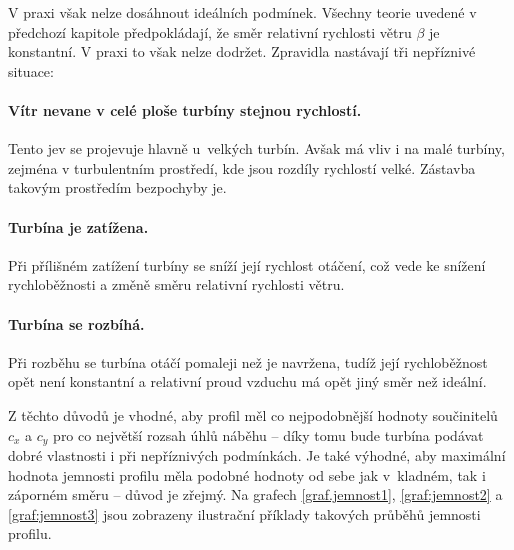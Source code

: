 V praxi však nelze dosáhnout ideálních podmínek. Všechny teorie uvedené v předchozí kapitole předpokládají, že směr relativní rychlosti větru $\beta$ je konstantní. V praxi to však nelze dodržet. Zpravidla nastávají tři nepříznivé situace:
\paragraph{Vítr nevane v celé ploše turbíny stejnou rychlostí.} Tento jev se projevuje hlavně u~velkých turbín. Avšak má vliv i na malé turbíny, zejména v turbulentním prostředí, kde jsou rozdíly rychlostí velké. Zástavba takovým prostředím bezpochyby je.
\paragraph{Turbína je zatížena.} Při přílišném zatížení turbíny se sníží její rychlost otáčení, což vede ke snížení rychloběžnosti a změně směru relativní rychlosti větru.
\paragraph{Turbína se rozbíhá.} Při rozběhu se turbína otáčí pomaleji než je navržena, tudíž její rychloběžnost opět není konstantní a relativní proud vzduchu má opět jiný směr než ideální.\vspace{0.5cm}

Z těchto důvodů je vhodné, aby profil měl co nejpodobnější hodnoty součinitelů $c_x$ a $c_y$ pro co největší rozsah úhlů náběhu – díky tomu bude turbína podávat dobré vlastnosti i při nepříznivých podmínkách. Je také výhodné, aby maximální hodnota jemnosti profilu měla podobné hodnoty od sebe jak v~kladném, tak i záporném směru – důvod je zřejmý. Na grafech \ref{graf.jemnost1}, \ref{graf:jemnost2} a \ref{graf:jemnost3} jsou zobrazeny ilustrační příklady takových průběhů jemnosti profilu.


